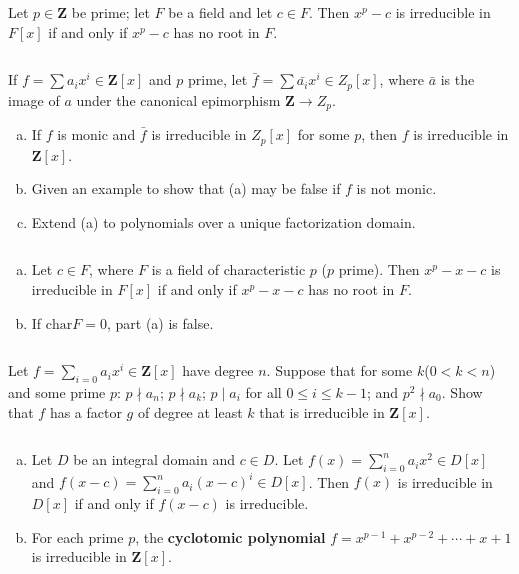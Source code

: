 $$ $$

\begin{ex}
    Let $p\in \mathbf{Z}$ be prime; let $F$ be a field and let $c\in F$. Then $x^{p}-c$ is irreducible in $F[x]$ if and only if $x^{p}-c$ has no root in $F$.
\end{ex}

$$ $$

\begin{ex}
    If $f=\sum a_{i}x^{i}\in \mathbf{Z}[x]$ and $p$ prime, let $\bar{f}=\sum \bar{a_{i}}x^{i}\in Z_{p}[x]$, where $\bar{a}$ is the image of $a$ under the canonical epimorphism $\mathbf{Z}\to Z_{p}$.
    \begin{enumerate}[(a)]
        \item If $f$ is monic and $\bar{f}$ is irreducible in $Z_{p}[x]$ for some $p$, then $f$ is irreducible in $\mathbf{Z}[x]$.
        \item Given an example to show that (a) may be false if $f$ is not monic.
        \item Extend (a) to polynomials over a unique factorization domain.
    \end{enumerate}
\end{ex}

$$ $$

\begin{ex}
    \begin{enumerate}[(a)]
        \item Let $c\in F$, where $F$ is a field of characteristic $p$ ($p$ prime). Then $x^{p}-x-c$ is irreducible in $F[x]$ if and only if $x^{p}-x-c$ has no root in $F$.
        \item If $\mathrm{char}F=0$, part (a) is false.
    \end{enumerate}
\end{ex}

$$ $$

\begin{ex}
    Let $f=\sum\limits_{i=0}a_{i}x^{i}\in \mathbf{Z}[x]$ have degree $n$. Suppose that for some $k$($0<k<n$) and some prime $p$: $p\nmid a_{n}$; $p\nmid a_{k}$; $p\mid a_{i}$ for all $0\leq i\leq k-1$; and $p^{2}\nmid a_{0}$. Show that $f$ has a factor $g$ of degree at least $k$ that is irreducible in $\mathbf{Z}[x]$.
\end{ex}

$$ $$

\begin{ex}
    \begin{enumerate}[(a)]
        \item Let $D$ be an integral domain and $c\in D$. Let $f(x)=\sum\limits_{i=0}^{n}a_{i}x^{2}\in D[x]$ and $f(x-c)=\sum\limits_{i=0}^{n}a_{i}(x-c)^{i}\in D[x]$. Then $f(x)$ is irreducible in $D[x]$ if and only if $f(x-c)$ is irreducible.
        \item For each prime $p$, the \textbf{cyclotomic polynomial} $f=x^{p-1}+x^{p-2}+\cdots+x+1$ is irreducible in $\mathbf{Z}[x]$.
    \end{enumerate}
\end{ex}

